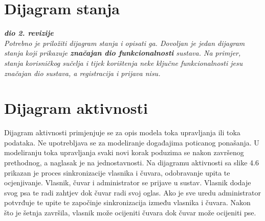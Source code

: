 			\eject
		
		\section{Dijagram stanja}
			
			
			\textbf{\textit{dio 2. revizije}}\\
			
			\textit{Potrebno je priložiti dijagram stanja i opisati ga. Dovoljan je jedan dijagram stanja koji prikazuje \textbf{značajan dio funkcionalnosti} sustava. Na primjer, stanja korisničkog sučelja i tijek korištenja neke ključne funkcionalnosti jesu značajan dio sustava, a registracija i prijava nisu. }
			
			
			\eject 
		
		\section{Dijagram aktivnosti}
			
			Dijagram aktivnosti primjenjuje se za opis modela toka upravljanja ili toka podataka. Ne upotrebljava se za modeliranje događajima poticanog ponašanja. U
			modeliranju toka upravljanja svaki novi korak poduzima se nakon završenog prethodnog, a naglasak je na jednostavnosti. Na dijagramu aktivnosti sa slike 4.6 prikazan je proces sinkronizacije vlasnika i čuvara, odobravanje upita te ocjenjivanje. Vlasnik, čuvar i administrator se prijave u sustav. Vlasnik dodaje svog psa te radi zahtjev dok čuvar radi svoj oglas.
			Ako je sve uredu administrator potvrđuje te upite te započinje sinkronizacija između vlasnika i čuvara. Nakon što je šetnja završila, vlasnik može ocijeniti čuvara dok čuvar može ocijeniti pse.
			
			\newpage
			
